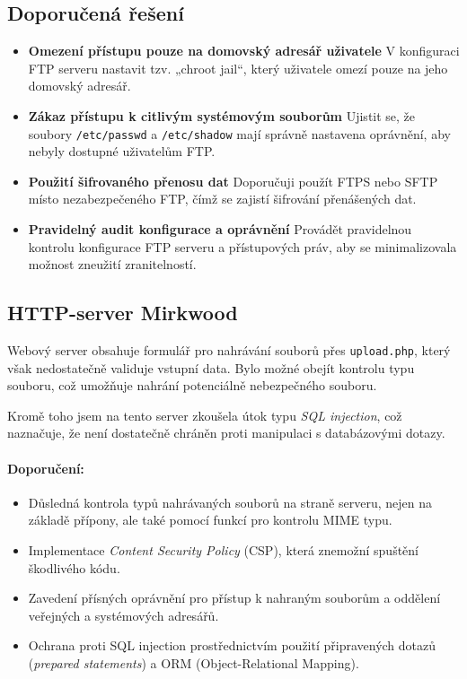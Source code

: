 \documentclass{article}
\begin{document}
\subsection*{Doporučená řešení}
\begin{itemize}
    \item \textbf{Omezení přístupu pouze na domovský adresář uživatele}  
    V konfiguraci FTP serveru nastavit tzv. „chroot jail“, který uživatele omezí pouze na jeho domovský adresář.
    \item \textbf{Zákaz přístupu k citlivým systémovým souborům}  
    Ujistit se, že soubory \texttt{/etc/passwd} a \texttt{/etc/shadow} mají správně nastavena oprávnění, aby nebyly dostupné uživatelům FTP.

    \item \textbf{Použití šifrovaného přenosu dat}  
    Doporučuji použít FTPS nebo SFTP místo nezabezpečeného FTP, čímž se zajistí šifrování přenášených dat.

    \item \textbf{Pravidelný audit konfigurace a oprávnění}  
    Provádět pravidelnou kontrolu konfigurace FTP serveru a přístupových práv, aby se minimalizovala možnost zneužití zranitelností.
\end{itemize}
\subsection{HTTP-server Mirkwood}
Webový server obsahuje formulář pro nahrávání souborů přes \texttt{upload.php}, který však nedostatečně validuje vstupní data. Bylo možné obejít kontrolu typu souboru, což umožňuje nahrání potenciálně nebezpečného souboru.

Kromě toho jsem na tento server zkoušela útok typu \textit{SQL injection}, což naznačuje, že není dostatečně chráněn proti manipulaci s databázovými dotazy.

\paragraph{Doporučení:}
\begin{itemize}
    \item Důsledná kontrola typů nahrávaných souborů na straně serveru, nejen na základě přípony, ale také pomocí funkcí pro kontrolu MIME typu.
    \item Implementace \textit{Content Security Policy} (CSP), která znemožní spuštění škodlivého kódu.
    \item Zavedení přísných oprávnění pro přístup k nahraným souborům a oddělení veřejných a systémových adresářů.
    \item Ochrana proti SQL injection prostřednictvím použití připravených dotazů (\textit{prepared statements}) a ORM (Object-Relational Mapping).
\end{itemize}
\end{document}

